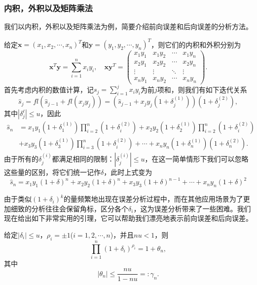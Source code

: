 \documentclass[a4paper,10pt]{ctexart}
\begin{document}
\subsubsection{内积，外积以及矩阵乘法}
我们以内积，外积以及矩阵乘法为例，简要介绍前向误差和后向误差的分析方法。

给定$ \bm{x} = (x_1,x_2,\cdots ,x_{n})^T $和$ \bm{y} = (y_1, y_2, \cdots, y_{n})^T $，则它们的内积和外积分别为
\[
    \bm{x}^T\bm{y} = \sum_{i=1}^{n}x_iy_i,\quad 
    \bm{x}\bm{y}^T = \begin{pmatrix}
        x_1y_1 & x_1y_2 & \cdots & x_1y_n \\
        x_2y_1 & x_2y_2 & \cdots & x_2y_n \\
        \vdots & \vdots & \ddots & \vdots \\
        x_ny_1 & x_ny_2 & \cdots & x_ny_n  
    \end{pmatrix}.
\]
首先考虑内积的数值计算，记$ s_j = \sum_{i=1}^j x_{i} y_{i} $为前$ j $项和，则我们有如下迭代关系
\[
    \hat{s}_j = fl(\hat{s}_{j-1} + fl(x_{j} y_{j})) = (\hat{s}_{j-1} + x_{j}y_{j}(1+\delta_j^{(1)}))(1+\delta_j^{(2)}),
\]
其中$ |\delta_j^{\ell}|\leqslant u $，因此
\[
    \begin{aligned}
        \hat{s}_n
        &= x_1y_1(1+\delta_1^{(1)})\prod_{i=2}^n(1+\delta_i^{(2)}) + x_2y_2(1+\delta_2^{(1)})\prod_{i=2}^n(1+\delta_i^{(2)})\\
        &+ x_3y_3(1+\delta_3^{(1)})\prod_{i=3}^n(1+\delta_i^{(2)}) + \cdots + x_ny_n(1+\delta_n^{(1)})(1+\delta_n^{(2)}).
    \end{aligned}
\]
由于所有的$ \delta_j^{(i)} $都满足相同的限制：$ |\delta_j^{(i)}|\leqslant u $，在这一简单情形下我们可以忽略这些量的区别，将它们统一记作$ \delta $，此时上式变为
\[
    \hat{s}_n = x_1y_1(1+\delta)^n + x_2y_2(1+\delta)^n + x_3y_3(1+\delta)^{n-1}+\cdots +x_ny_n(1+\delta)^2
\]

由于类似$ (1+\delta_i)^k $的量频繁地出现在误差分析过程中，而在其他应用场景为了更加细致的分析往往会保留角标，区分各个$ \delta_i $，这为误差分析带来了一些困难。我们现在给出如下非常实用的引理，它可以帮助我们漂亮地表示前向误差和后向误差。
\begin{lemma}\label{lem_1}
    给定$ |\delta_i|\leqslant u $，$ \rho_i=\pm 1 $($ i=1,2,\cdots ,n $)，并且$ nu<1 $，则
    \begin{equation}
        \prod_{i=1}^n (1+\delta_i)^{\rho_i} = 1+\theta_n,
    \end{equation}
    其中
    \begin{equation}
        |\theta_n|\leqslant \frac{n u}{1 - n u}=:\gamma_n.
    \end{equation}
\end{lemma}
\end{document}
